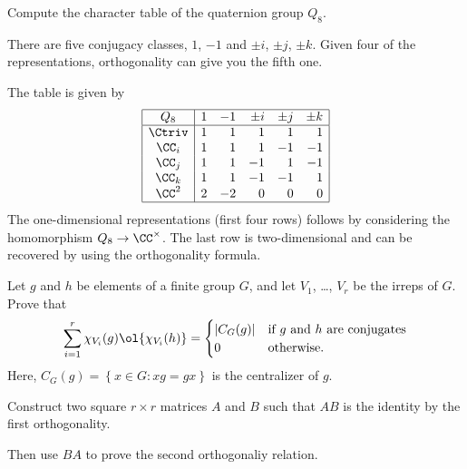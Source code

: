 \begin{problem}
	[Quaternions]
	Compute the character table of the quaternion group $Q_8$.
	\begin{hint}
		There are five conjugacy classes, $1$, $-1$
		and $\pm i$, $\pm j$, $\pm k$.
		Given four of the representations, orthogonality
		can give you the fifth one.
	\end{hint}
	\begin{sol}
		The table is given by
		\[
			\begin{array}{|c|rrrrr|}
				\hline
				Q_8 & 1 & -1 & \pm i & \pm j & \pm k \\ \hline
				\Ctriv & 1 & 1 & 1 & 1 & 1 \\
				\CC_i & 1 & 1 & 1 & -1 & -1 \\
				\CC_j & 1 & 1 & -1 & 1 & -1 \\
				\CC_k & 1 & 1 & -1 & -1 & 1 \\
				\CC^2 & 2 & -2 & 0 & 0 & 0 \\\hline
			\end{array}
		\]
		The one-dimensional representations (first four rows)
		follows by considering the homomorphism $Q_8 \to \CC^\times$.
		The last row is two-dimensional and can be recovered
		by using the orthogonality formula.
	\end{sol}
\end{problem}

\begin{sproblem}
	\label{prob:second_orthog}
	\gim
	Let $g$ and $h$ be elements of a finite group $G$,
	and let $V_1$, \dots, $V_r$ be the irreps of $G$.
	Prove that
	\[
		\sum_{i = 1}^r \chi_{V_i}(g) \ol{\chi_{V_i}(h)}
		=
		\begin{cases}
			|C_G(g)| & \text{if $g$ and $h$ are conjugates} \\
			0 & \text{otherwise}.
		\end{cases}
	\]
	Here, $C_G(g) = \left\{ x \in G : xg = gx \right\}$
	is the centralizer of $g$.
	\begin{hint}
        Construct two square $r \times r$ matrices $A$ and $B$ 
        such that $AB$ is the identity by the first orthogonality.

        Then use $BA$ to prove the second orthogonaliy relation.
	\end{hint}
\end{sproblem}
